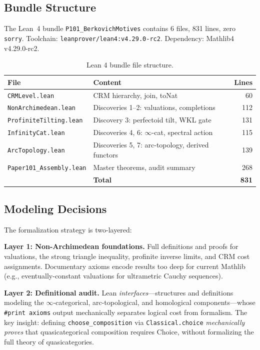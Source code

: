 \documentclass[11pt,a4paper]{article}
\theoremstyle{plain}
\theoremstyle{definition}
\begin{document}
\subsection{Bundle Structure}

The Lean~4 bundle \texttt{P101\_BerkovichMotives} contains 6 files, 831 lines, zero \texttt{sorry}. Toolchain: \texttt{leanprover/lean4:v4.29.0-rc2}. Dependency: Mathlib4 v4.29.0-rc2.

\begin{table}[ht]
\centering
\begin{tabular}{@{}llr@{}}
\toprule
\textbf{File} & \textbf{Content} & \textbf{Lines} \\
\midrule
\texttt{CRMLevel.lean} & CRM hierarchy, join, toNat & 60 \\
\texttt{NonArchimedean.lean} & Discoveries 1--2: valuations, completions & 112 \\
\texttt{ProfiniteTilting.lean} & Discovery 3: perfectoid tilt, WKL gate & 131 \\
\texttt{InfinityCat.lean} & Discoveries 4, 6: $\infty$-cat, spectral action & 115 \\
\texttt{ArcTopology.lean} & Discoveries 5, 7: arc-topology, derived functors & 139 \\
\texttt{Paper101\_Assembly.lean} & Master theorems, audit summary & 268 \\
\midrule
& \textbf{Total} & \textbf{831} \\
\bottomrule
\end{tabular}
\caption{Lean 4 bundle file structure.}
\label{tab:lean-files}
\end{table}

\subsection{Modeling Decisions}

The formalization strategy is two-layered:

\textbf{Layer 1: Non-Archimedean foundations.} Full definitions and proofs for valuations, the strong triangle inequality, profinite inverse limits, and CRM cost assignments. Documentary axioms encode results too deep for current Mathlib (e.g., eventually-constant valuations for ultrametric Cauchy sequences).

\textbf{Layer 2: Definitional audit.} Lean \emph{interfaces}---structures and definitions modeling the $\infty$-categorical, arc-topological, and homological components---whose \texttt{\#print axioms} output mechanically separates logical cost from formalism. The key insight: defining \texttt{choose\_composition} via \texttt{Classical.choice} \emph{mechanically proves} that quasicategorical composition requires Choice, without formalizing the full theory of quasicategories.
\end{document}
